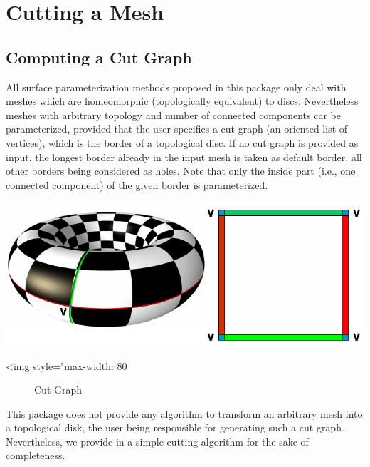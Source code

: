 \section{Cutting a Mesh \label{sec:Cutting-a-Mesh}}

\subsection{Computing a Cut Graph}

All surface parameterization methods proposed in this package only
deal with meshes which are homeomorphic (topologically equivalent) to discs.
Nevertheless meshes with arbitrary topology and number of connected components car be parameterized, provided that the user specifies a cut graph (an oriented list of vertices), which is the border of a topological disc. If no cut graph is
provided as input, the longest border already
in the input mesh is taken as default border, all other borders being considered as holes. Note that only the inside part (i.e., one connected component) of the given border is parameterized.

\begin{center}
    \label{Surface_mesh_parameterization-fig-cut}
    \begin{ccTexOnly}
        \includegraphics[width=1.0\textwidth]{Surface_mesh_parameterization/cut}
    \end{ccTexOnly}
    \begin{ccHtmlOnly}
        <img style="max-width: 80%
    \end{ccHtmlOnly}
    \begin{figure}[h]
        \caption{Cut Graph}
    \end{figure}
\end{center}

This package does not provide any algorithm to transform an arbitrary mesh
into a topological disk, the user being responsible
for generating such a cut graph. Nevertheless, we provide in
a simple cutting algorithm for the sake of completeness.



